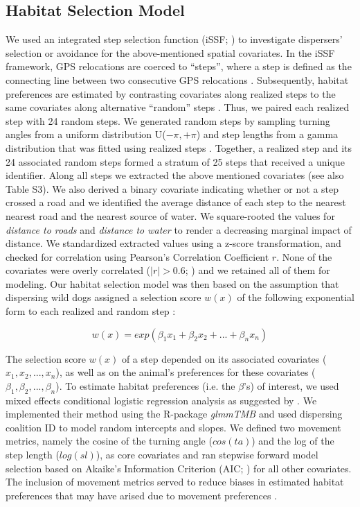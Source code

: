 \documentclass[abstract=on,10pt,a4paper,bibliography=totocnumbered]{article}
\begin{document}
\subsection{Habitat Selection Model}
We used an integrated step selection function (iSSF; \citealp{Avgar.2016}) to
investigate dispersers' selection or avoidance for the above-mentioned spatial
covariates. In the iSSF framework, GPS relocations are coerced to  ``steps'',
where a step is defined as the connecting line between two consecutive GPS
relocations \citep{Turchin.1998}. Subsequently, habitat preferences are
estimated by contrasting covariates along realized steps to the same covariates
along alternative ``random''  steps \citep{Fortin.2005, Thurfjell.2014,
Avgar.2016}. Thus, we paired each realized step with 24 random steps. We
generated random steps by sampling turning angles from a uniform distribution
U(\(-\pi, +\pi\)) and step lengths from a gamma distribution that was fitted
using realized steps \citep{Avgar.2016}. Together, a realized step and its 24
associated random steps formed a stratum of 25 steps that received a unique
identifier. Along all steps we extracted the above mentioned covariates (see
also Table S3). We also derived a binary covariate indicating whether or not a
step crossed a road and we identified the average distance of each step to the
nearest nearest road and the nearest source of water. We square-rooted the
values for \textit{distance to roads} and \textit{distance to water} to render a
decreasing marginal impact of distance. We standardized extracted values using a
z-score transformation, and checked for correlation using Pearson's Correlation
Coefficient \(r\). None of the covariates were overly correlated (\(|r| > 0.6\);
\citealp{Latham.2011}) and we retained all of them for modeling. Our habitat
selection model was then based on the assumption that dispersing wild dogs
assigned a selection score \(w(x)\) of the following exponential form to each
realized and random step \citep{Fortin.2005, Thurfjell.2014, Avgar.2016}:

\begin{equation}
\label{EQ1}
  w(x) = exp(\beta_1 x_1 + \beta_2 x_2 + ... + \beta_n x_n)
\end{equation}

\noindent The selection score \(w(x)\) of a step depended on its associated
covariates (\(x_1, x_2, ..., x_n\)), as well as on the animal's preferences for
these covariates (\(\beta_1, \beta_2, ..., \beta_n\)). To estimate habitat
preferences (i.e. the \(\beta\)'s) of interest, we used mixed effects
conditional logistic regression analysis as suggested by \cite{Muff.2020}. We
implemented their method using the R-package \textit{glmmTMB}
\citep{Mollie.2017} and used dispersing coalition ID to model random intercepts
and slopes. We defined two movement metrics, namely the cosine of the turning
angle (\(cos(ta)\)) and the log of the step length (\(log(sl)\)), as core
covariates and ran stepwise forward model selection based on Akaike's
Information Criterion (AIC; \citealp{Burnham.2002}) for all other covariates.
The inclusion of movement metrics served to reduce biases in estimated habitat
preferences that may have arised due to movement preferences \citep{Avgar.2016}.
\end{document}
